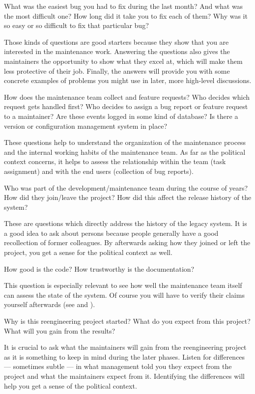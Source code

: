 \documentclass[a4paper,10pt,twoside]{book}
\begin{document}
\begin{bulletlist}
  \item What was the easiest bug you had to fix during the last month? And what was the most difficult one? How long did it take you to fix each of them? Why was it so easy or so difficult to fix that particular bug?

Those kinds of questions are good starters because they show that you are interested in the maintenance work. Answering the questions also gives the maintainers the opportunity to show what they excel at, which will make them less protective of their job. Finally, the answers will provide you with some concrete examples of  problems you might use in later, more high-level discussions.

  \item How does the maintenance team collect  and feature requests? Who decides which request gets handled first? Who decides to assign a bug report or feature request to a maintainer? Are these events logged in some kind of database? Is there a version or configuration management system in place?

These questions help to understand the organization of the maintenance process and the internal working habits of the maintenance team. As far as the political context concerns, it helps to assess the relationship within the team (task assignment) and with the end users (collection of bug reports).

  \item Who was part of the development/maintenance team during the course of years? How did they join/leave the project? How did this affect the release history of the system?

These are questions which directly address the history of the legacy system. It is a good idea to ask about persons because people generally have a good recollection of former colleagues. By afterwards asking how they joined or left the project, you get a sense for the political context as well.

  \item How good is the code? How trustworthy is the documentation?

This question is especially relevant to see how well the maintenance team itself can assess the state of the system. Of course you will have to verify their claims yourself afterwards (see  and ).

  \item Why is this reengineering project started? What do you expect from this project? What will you gain from the results?

It is crucial to ask what the maintainers will gain from the reengineering project as it is something to keep in mind during the later phases. Listen for differences --- sometimes subtle --- in what management told you they expect from the project and what the maintainers expect from it. Identifying the differences will help you get a sense of the political context.

\end{bulletlist}
\end{document}
